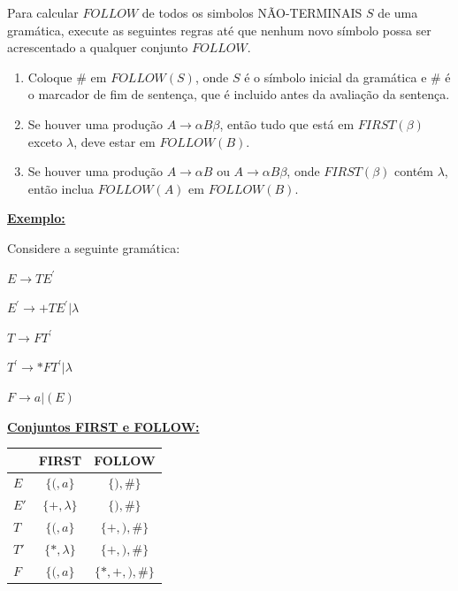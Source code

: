 \documentclass[
  brazilian,
  letterpaper,
]{book}
\theoremstyle{plain}
\theoremstyle{definition}
\theoremstyle{remark}
\begin{document}
\begin{tcolorbox}[enhanced jigsaw, toptitle=1mm, rightrule=.15mm, title=\textcolor{quarto-callout-note-color}{\faInfo}\hspace{0.5em}{Resumo do Cálculo de FOLLOW}, toprule=.15mm, colback=white, left=2mm, arc=.35mm, opacitybacktitle=0.6, colframe=quarto-callout-note-color-frame, breakable, coltitle=black, titlerule=0mm, bottomtitle=1mm, leftrule=.75mm, bottomrule=.15mm, opacityback=0, colbacktitle=quarto-callout-note-color!10!white]

Para calcular \(FOLLOW\) de todos os simbolos NÃO-TERMINAIS \(S\) de uma
gramática, execute as seguintes regras até que nenhum novo símbolo possa
ser acrescentado a qualquer conjunto \(FOLLOW\).

\begin{enumerate}
\def\labelenumi{\arabic{enumi}.}
\item
  Coloque \(\#\) em \(FOLLOW(S)\), onde \(S\) é o símbolo inicial da
  gramática e \(\#\) é o marcador de fim de sentença, que é incluido
  antes da avaliação da sentença.
\item
  Se houver uma produção \(A \rightarrow \alpha B \beta\), então tudo
  que está em \(FIRST(\beta)\) exceto \(\lambda\), deve estar em
  \(FOLLOW(B)\).
\item
  Se houver uma produção \(A \rightarrow \alpha B\) ou
  \(A \rightarrow \alpha B \beta\), onde \(FIRST(\beta)\) contém
  \(\lambda\), então inclua \(FOLLOW(A)\) em \(FOLLOW(B)\).
\end{enumerate}

\end{tcolorbox}

\ul{\textbf{Exemplo:}}

Considere a seguinte gramática:

\(E \rightarrow TE^{'}\)

\(E^{'} \rightarrow +TE^{'} | \lambda\)

\(T \rightarrow FT^{'}\)

\(T^{'} \rightarrow *FT^{'} | \lambda\)

\(F \rightarrow a | (E)\)

\ul{\textbf{Conjuntos FIRST e FOLLOW:}}

\begin{longtable*}[]{|l|c|c|}
\toprule\noalign{}
& FIRST & FOLLOW \\
\midrule\noalign{}
\endhead
\bottomrule\noalign{}
\endlastfoot
\(E\) & \(\{(, a\}\) & \(\{), \#\}\) \\
\midrule
\(E'\) & \(\{+, \lambda\}\) & \(\{), \#\}\) \\
\midrule
\(T\) & \(\{(, a\}\) & \(\{+, ), \#\}\) \\
\midrule
\(T'\) & \(\{*, \lambda\}\) & \(\{+, ), \#\}\) \\
\midrule
\(F\) & \(\{(, a\}\) & \(\{*, +, ), \#\}\) \\
\end{longtable*}
\end{document}
